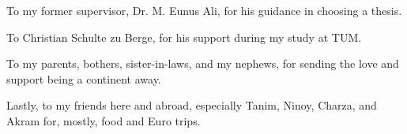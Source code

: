 \vspace{2mm} To my former supervisor, Dr. M. Eunus Ali, for his guidance in choosing a thesis.

\vspace{2mm} To Christian Schulte zu Berge, for his support during my study at TUM.

\vspace{2mm} To my parents, bothers, sister-in-laws, and my nephews, for sending the love and support being a continent away.

\vspace{2mm} Lastly, to my friends here and abroad, especially Tanim, Ninoy, Charza, and Akram for, mostly, food and Euro trips.

